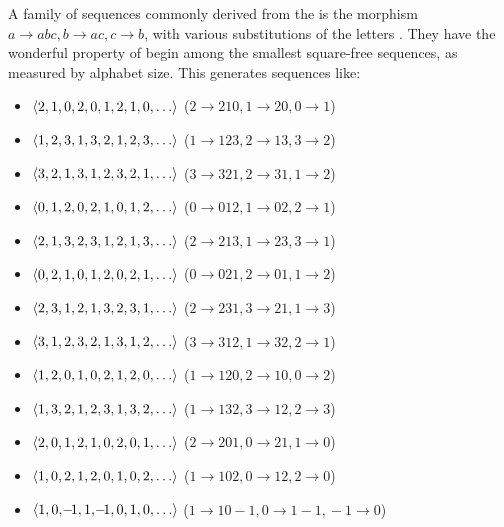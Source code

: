 \documentclass[conference]{IEEEtran}
\begin{document}
A family of sequences commonly derived from the \TMS is the morphism $a\to abc, b\to ac, c\to b$, with various substitutions of the letters \cite{pannipitiya_2024, OEIS-A036577, OEIS-A007413, OEIS-A036585, OEIS-A036580, OEIS-A005679, OEIS-A036581, OEIS-A036582, OEIS-A036584, OEIS-A036579, OEIS-A036583, OEIS-A036586, OEIS-A036578, OEIS-A029883}. They have the wonderful property of begin among the smallest square-free sequences, as measured by alphabet size. This generates sequences like: \begin{itemize}
    \item $\tuple{2, 1, 0, 2, 0, 1, 2, 1, 0, \dots}$ \cite{pannipitiya_2024, OEIS-A036577} ($2\!\to\!210, \!1\!\to\!20, 0\!\to\!1$)
    \item $\tuple{1, 2, 3, 1, 3, 2, 1, 2, 3, \dots}$ \cite{OEIS-A007413} ($1\!\to\!123, 2\!\to\!13, 3\!\to\!2$)
    \item $\tuple{3, 2, 1, 3, 1, 2, 3, 2, 1, \dots}$ \cite{OEIS-A036585} ($3\!\to\!321, 2\!\to\!31, 1\!\to\!2$)
    \item $\tuple{0, 1, 2, 0, 2, 1, 0, 1, 2, \dots}$ \cite{OEIS-A036580} ($0\!\to\!012, 1\!\to\!02, 2\!\to\!1$)
    \item $\tuple{2, 1, 3, 2, 3, 1, 2, 1, 3, \dots}$ \cite{OEIS-A005679} ($2\!\to\!213, 1 \!\to\! 23, 3\!\to\!1$)
    \item $\tuple{0, 2, 1, 0, 1, 2, 0, 2, 1, \dots}$ \cite{OEIS-A036581} ($0\!\to\!021, 2\!\to\!01, 1\!\to\!2$)
    \item $\tuple{2, 3, 1, 2, 1, 3, 2, 3, 1, \dots}$ \cite{OEIS-A036582} ($2\!\to\!231, 3\!\to\!21, 1\!\to\!3$)
    \item $\tuple{3, 1, 2, 3, 2, 1, 3, 1, 2, \dots}$ \cite{OEIS-A036584} ($3\!\to\!312, 1\!\to\!32, 2\!\to\!1$)
    \item $\tuple{1, 2, 0, 1, 0, 2, 1, 2, 0, \dots}$ \cite{OEIS-A036579} ($1\!\to\!120, 2\!\to\!10, 0\!\to\!2$)
    \item $\tuple{1, 3, 2, 1, 2, 3, 1, 3, 2, \dots}$ \cite{OEIS-A036583} ($1\!\to\!132, 3\!\to\!12, 2\!\to\!3$)
    \item $\tuple{2, 0, 1, 2, 1, 0, 2, 0, 1, \dots}$ \cite{OEIS-A036586} ($2\!\to\!201, 0\!\to\!21, 1\!\to\!0$)
    \item $\tuple{1, 0, 2, 1, 2, 0, 1, 0, 2, \dots}$ \cite{OEIS-A036578} ($1\!\to\!102, 0\!\to\!12, 2\!\to\!0$)
    \item $\tuple{1, 0, \!-\!1, 1, \!-\!1, 0, 1, 0, \dots}$\hspace{2pt} \cite{OEIS-A029883} ($1\!\to\!10\!\!-\!\!1, 0\!\to\!1\!\!-\!\!1, \!-\!1\!\to\!0$)
\end{itemize}
\end{document}
